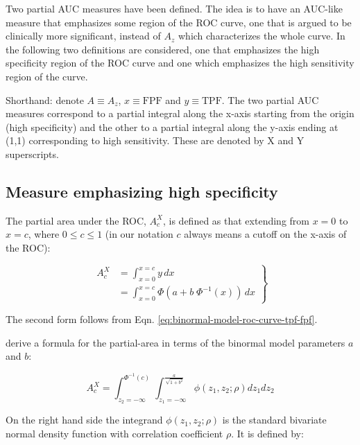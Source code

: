 \documentclass[
]{book}
\begin{document}
Two partial AUC measures have been defined. The idea is to have an AUC-like measure that emphasizes some region of the ROC curve, one that is argued to be clinically more significant, instead of \(A_z\) which characterizes the whole curve. In the following two definitions are considered, one that emphasizes the high specificity region of the ROC curve and one which emphasizes the high sensitivity region of the curve.

Shorthand: denote \(A \equiv A_z\), \(x \equiv \text{FPF}\) and \(y \equiv \text{TPF}\). The two partial AUC measures correspond to a partial integral along the x-axis starting from the origin (high specificity) and the other to a partial integral along the y-axis ending at (1,1) corresponding to high sensitivity. These are denoted by X and Y superscripts.

\hypertarget{binormal-model-meaning-partial-auc-definitions}{%
\subsection{Measure emphasizing high specificity}\label{binormal-model-meaning-partial-auc-definitions}}

The partial area under the ROC, \(A_c^{X}\), is defined as that extending from \(x = 0\) to \(x = c\), where \(0 \le c \le 1\) (in our notation \(c\) always means a cutoff on the x-axis of the ROC):

\begin{equation} 
\left. 
\begin{aligned}
A_c^{X} &= \int_{x=0}^{x=c} y \, dx 
\\&=  \int_{x=0}^{x=c} \Phi\left ( a + b \; \Phi^{-1} \left ( x \right ) \right ) \, dx 
\end{aligned}
\right \}
\label{eq:binormal-model-partial-area-a1}
\end{equation}

The second form follows from Eqn. \eqref{eq:binormal-model-roc-curve-tpf-fpf}.

\citep{thompson1989statistical} derive a formula for the partial-area in terms of the binormal model parameters \(a\) and \(b\):

\begin{equation}
A_c^{X} = \int_{z_2=-\infty}^{\Phi^{-1}\left ( c \right )}   \int_{z_1=-\infty}^{\frac{a}{\sqrt{1+b^2}}} \phi\left ( z_1,z_2;\rho \right ) dz_1dz_2
\label{eq:binormal-model-partial-area-final}
\end{equation}

On the right hand side the integrand \(\phi\left ( z_1,z_2;\rho \right )\) is the standard bivariate normal density function with correlation coefficient \(\rho\). It is defined by:
\end{document}
